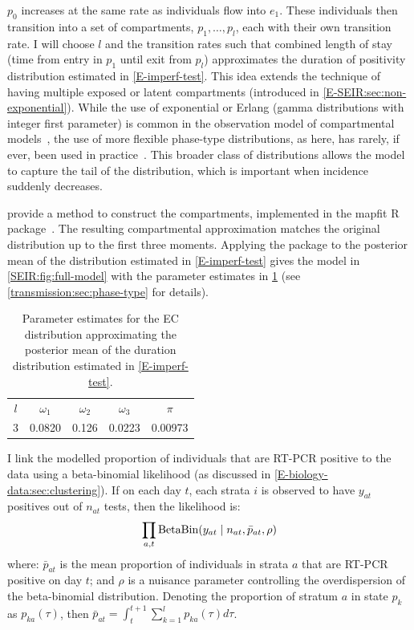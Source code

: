 \documentclass[thesis.tex]{subfiles}
\begin{document}
$p_0$ increases at the same rate as individuals flow into $e_1$.
These individuals then transition into a set of compartments, $p_1, \dots, p_l$, each with their own transition rate.
I will choose $l$ and the transition rates such that combined length of stay (\ie time from entry in $p_1$ until exit from $p_l$) approximates the duration of positivity distribution estimated in \cref{E-imperf-test}.
This idea extends the technique of having multiple exposed or latent compartments (introduced in \cref{E-SEIR:sec:non-exponential}).
While the use of exponential or Erlang (gamma distributions with integer first parameter) is common in the observation model of compartmental models~\autocite[e.g.][]{overtonEpiBeds}, the use of more flexible phase-type distributions, as here, has rarely, if ever, been used in practice~\autocite{hurtadoGLCT}.
This broader class of distributions allows the model to capture the tail of the distribution, which is important when incidence suddenly decreases.

\Textcite{osogamiClosed} provide a method to construct the compartments, implemented in the mapfit R package~\autocite{mapfit}. 
The resulting compartmental approximation matches the original distribution up to the first three moments.
Applying the package to the posterior mean of the distribution estimated in \cref{E-imperf-test} gives the model in \cref{SEIR:fig:full-model} with the parameter estimates in \cref{SEIR:table:ec-params} (see \cref{transmission:sec:phase-type} for details).
\begin{table}
    \centering
    \begin{tabular}{c c c c c}
        $l$ & $\omega_1$ & $\omega_{2}$ & $\omega_{3}$ & $\pi$ \\
        3 & 0.0820 & 0.126 & 0.0223 & 0.00973  \\
    \end{tabular}
    \caption{Parameter estimates for the EC distribution approximating the posterior mean of the duration distribution estimated in \cref{E-imperf-test}.}
    \label{SEIR:table:ec-params}
\end{table}

I link the modelled proportion of individuals that are RT-PCR positive to the data using a beta-binomial likelihood (as discussed in \cref{E-biology-data:sec:clustering}).
If on each day $t$, each strata $i$ is observed to have $y_{at}$ positives out of $n_{at}$ tests, then the likelihood is:
\begin{align}
    \prod_{a,t} \operatorname{BetaBin} (y_{at} \mid n_{at}, \bar{p}_{at}, \rho)
    \label{SEIR:eq:likelihood}
\end{align}
where: $\bar{p}_{at}$ is the mean proportion of individuals in strata $a$ that are RT-PCR positive on day $t$; and $\rho$ is a nuisance parameter controlling the overdispersion of the beta-binomial distribution.
Denoting the proportion of stratum $a$ in state $p_k$ as $p_{ka}(\tau)$, then $\bar{p}_{at} = \int_{t}^{t+1} \sum_{k=1}^l p_{ka}(\tau) d\tau$.
\end{document}
